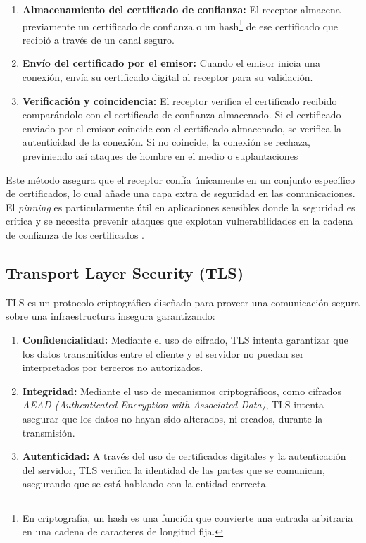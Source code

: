 \begin{enumerate}
    \item \textbf{Almacenamiento del certificado de confianza: }El receptor almacena previamente un certificado de confianza o un hash\footnote{En criptografía, un hash es una función que convierte una entrada arbitraria en una cadena de caracteres de longitud fija.} de ese certificado que recibió a través de un canal seguro.
    \item \textbf{Envío del certificado por el emisor: }Cuando el emisor inicia una conexión, envía su certificado digital al receptor para su validación.
    \item \textbf{Verificación y coincidencia: }El receptor verifica el certificado recibido comparándolo con el certificado de confianza almacenado. Si el certificado enviado por el emisor coincide con el certificado almacenado, se verifica la autenticidad de la conexión. Si no coincide, la conexión se rechaza, previniendo así ataques de hombre en el medio o suplantaciones
\end{enumerate}

Este método asegura que el receptor confía únicamente en un conjunto específico de certificados, lo cual añade una capa extra de seguridad en las comunicaciones. El \textit{pinning} es particularmente útil en aplicaciones sensibles donde la seguridad es crítica y se necesita prevenir ataques que explotan vulnerabilidades en la cadena de confianza de los certificados \cite{stallings2005cryptography, ristic2014bulletproof}.


\subsection{Transport Layer Security (TLS)}
\label{sec:TLS}
TLS es un protocolo criptográfico diseñado para proveer una comunicación segura sobre una infraestructura insegura garantizando:

\begin{enumerate}
    \item \textbf{Confidencialidad: }Mediante el uso de cifrado, TLS intenta garantizar que los datos transmitidos entre el cliente y el servidor no puedan ser interpretados por terceros no autorizados.
    \item \textbf{Integridad: }Mediante el uso de mecanismos criptográficos, como cifrados \textit{AEAD (Authenticated Encryption with Associated Data)}, TLS intenta asegurar que los datos no hayan sido alterados, ni creados, durante la transmisión.
    \item \textbf{Autenticidad: }A través del uso de certificados digitales y la autenticación del servidor, TLS verifica la identidad de las partes que se comunican, asegurando que se está hablando con la entidad correcta.
\end{enumerate}

